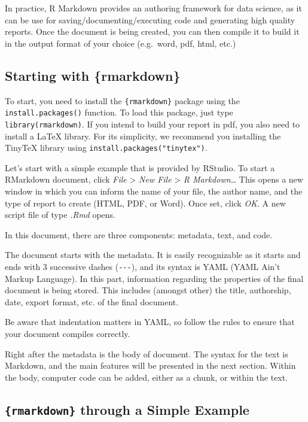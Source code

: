 \documentclass[
]{krantz}
\begin{document}
In practice, R Markdown provides an authoring framework for data science, as it can be use for saving/documenting/executing code and generating high quality reports. Once the document is being created, you can then compile it to build it in the output format of your choice (e.g.~word, pdf, html, etc.)

\hypertarget{starting-with-rmarkdown}{%
\subsection{Starting with \{rmarkdown\}}\label{starting-with-rmarkdown}}

To start, you need to install the \texttt{\{rmarkdown\}} package using the \texttt{install.packages()} function. To load this package, just type \texttt{library(rmarkdown)}. If you intend to build your report in pdf, you also need to install a LaTeX library. For its simplicity, we recommend you installing the TinyTeX library using \texttt{install.packages("tinytex")}.

Let's start with a simple example that is provided by RStudio. To start a RMarkdown document, click \emph{File} \textgreater{} \emph{New File} \textgreater{} \emph{R Markdown\ldots{}} This opens a new window in which you can inform the name of your file, the author name, and the type of report to create (HTML, PDF, or Word). Once set, click \emph{OK}. A new script file of type \emph{.Rmd} opens.

In this document, there are three components: metadata, text, and code.

The document starts with the metadata. It is easily recognizable as it starts and ends with 3 successive dashes (\texttt{-\/-\/-}), and its syntax is YAML (YAML Ain't Markup Language). In this part, information regarding the properties of the final document is being stored. This includes (amongst other) the title, authorship, date, export format, etc. of the final document.

Be aware that indentation matters in YAML, so follow the rules to ensure that your document compiles correctly.

Right after the metadata is the body of document. The syntax for the text is Markdown, and the main features will be presented in the next section. Within the body, computer code can be added, either as a chunk, or within the text.

\hypertarget{rmarkdown-through-a-simple-example}{%
\subsection{\texorpdfstring{\texttt{\{rmarkdown\}} through a Simple Example}{\{rmarkdown\} through a Simple Example}}\label{rmarkdown-through-a-simple-example}}
\end{document}

